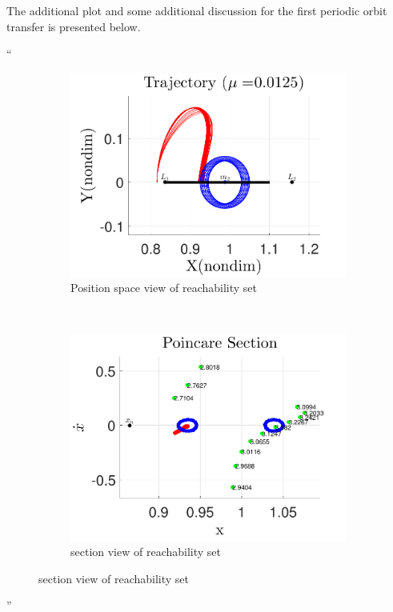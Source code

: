 \documentclass[11pt]{article}
\newenvironment{correction}{\begin{list}{}{\setlength{\leftmargin}{1cm}\setlength{\rightmargin}{1cm}}\vspace{\parsep}\item[]``}{''\end{list}}
\begin{document}
\begin{itemize}
        The additional plot and some additional discussion for the first periodic orbit transfer is presented below.
        \begin{correction}
            \begin{figure} 
                \centering 
                \begin{subfigure}[htbp]{0.4\textwidth} 
                    \includegraphics[width=\textwidth]{reach_trajectory} 
                    \caption{Position space view of reachability set} \label{fig:reach_trajectory} 
                \end{subfigure}~ %
                \begin{subfigure}[htbp]{0.4\textwidth} 
                    \includegraphics[width=\textwidth]{poincare_compare} 
                    \caption{\Poincare section view of reachability set} \label{fig:poincare_compare} 
                \end{subfigure} %


\end{figure}
\end{correction}
\end{itemize}
\end{document}
